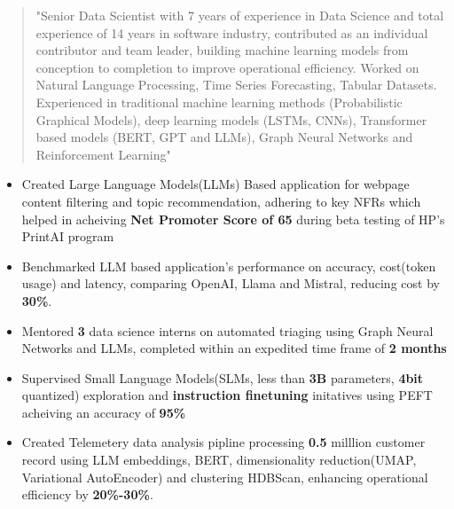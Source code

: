 \documentclass[10pt,a4paper,ragged2e,withhyper]{altacv}
\author{Gaurav Sood}
\date{\today}
\title{}
\begin{document}

\makecvheader

\begin{paracol}{1}
 \begin{quote}
"Senior Data Scientist with 7 years of experience in Data Science and total experience of 14 years in software industry, contributed as an individual contributor and team leader, building machine learning models from conception to completion to improve operational efficiency. Worked on  Natural Language Processing, Time Series Forecasting, Tabular Datasets. Experienced in traditional machine learning methods (Probabilistic Graphical Models), deep learning models (LSTMs, CNNs), Transformer based models (BERT, GPT and LLMs), Graph Neural Networks and Reinforcement Learning"
 \end{quote}
\label{sec:org6de0e87}


\divider

\divider


\label{sec:org01e59ed}

\begin{itemize}
\item Created Large Language Models(LLMs) Based application for webpage content
filtering and topic recommendation, adhering to key NFRs which helped in
acheiving \textbf{\textbf{Net Promoter Score of 65}} during beta testing of HP's PrintAI
program
\item Benchmarked LLM based application's performance on accuracy, cost(token usage)
and latency, comparing OpenAI, Llama and Mistral, reducing cost by \textbf{\textbf{30\%}}.
\item Mentored \textbf{\textbf{3}} data science interns on automated triaging using Graph Neural
Networks and LLMs, completed within an expedited time frame of \textbf{\textbf{2 months}}
\item Supervised Small Language Models(SLMs, less than \textbf{\textbf{3B}} parameters, \textbf{\textbf{4bit}}
quantized) exploration and \textbf{\textbf{instruction finetuning}}
initatives using PEFT acheiving an accuracy of \textbf{\textbf{95\%}}
\item Created Telemetery data analysis pipline processing \textbf{\textbf{0.5}} milllion customer
record using LLM embeddings, BERT, dimensionality reduction(UMAP, Variational
AutoEncoder) and clustering HDBScan, enhancing operational efficiency by \textbf{\textbf{20\%-30\%}}.
\end{itemize}


\end{paracol}
\end{document}

